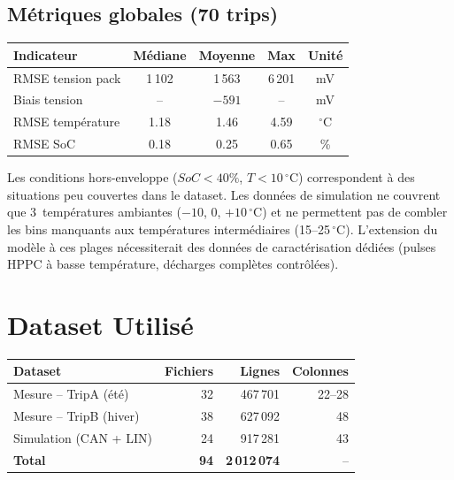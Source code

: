 \documentclass[a4paper,11pt]{article}
\begin{document}
\subsection{Métriques globales (70 trips)}

\begin{center}
\renewcommand{\arraystretch}{1.4}
\begin{tabular}{lcccc}
\toprule
\textbf{Indicateur} & \textbf{Médiane} & \textbf{Moyenne} & \textbf{Max} & \textbf{Unité} \\
\midrule
RMSE tension pack & 1\,102 & 1\,563 & 6\,201 & mV \\
Biais tension & -- & $-591$ & -- & mV \\
RMSE température & 1.18 & 1.46 & 4.59 & $^\circ$C \\
RMSE SoC & 0.18 & 0.25 & 0.65 & \% \\
\bottomrule
\end{tabular}
\end{center}

\begin{warnbox}
Les conditions hors-enveloppe ($SoC < 40\%$, $T < 10\,^\circ$C) correspondent
à des situations peu couvertes dans le dataset. Les données de simulation
ne couvrent que 3~températures ambiantes ($-10$, $0$, $+10\,^\circ$C) et ne
permettent pas de combler les bins manquants aux températures intermédiaires
(15--25$\,^\circ$C). L'extension du modèle à ces plages nécessiterait des
données de caractérisation dédiées (pulses HPPC à basse température,
décharges complètes contrôlées).
\end{warnbox}

\section{Dataset Utilisé}

\begin{center}
\renewcommand{\arraystretch}{1.3}
\begin{tabular}{lrrr}
\toprule
\textbf{Dataset} & \textbf{Fichiers} & \textbf{Lignes} & \textbf{Colonnes} \\
\midrule
Mesure -- TripA (été) & 32 & 467\,701 & 22--28 \\
Mesure -- TripB (hiver) & 38 & 627\,092 & 48 \\
Simulation (CAN + LIN) & 24 & 917\,281 & 43 \\
\midrule
\textbf{Total} & \textbf{94} & \textbf{2\,012\,074} & -- \\
\bottomrule
\end{tabular}
\end{center}
\end{document}
